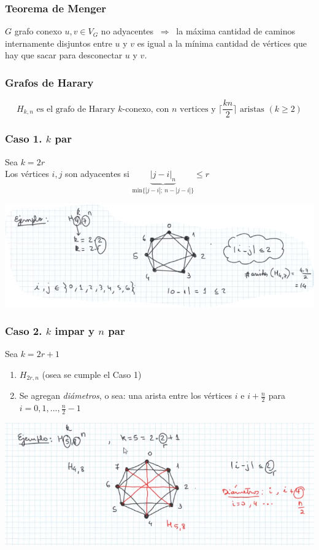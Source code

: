 \documentclass{article}
\newcommand{\Rightarrows}{\: \Rightarrow \:}            %
\begin{document}
\subsubsection{Teorema de Menger}
$G$ grafo conexo $u, v \in V_G$ no adyacentes $\Rightarrows$ la máxima cantidad de
caminos internamente disjuntos entre $u$ y $v$ es igual a la mínima cantidad de
vértices que hay que sacar para desconectar $u$ y $v$.

\subsubsection{Grafos de Harary}
\begin{equation*}
    H_{k,n} \text{ es el grafo de Harary $k$-conexo, con $n$ vertices y } \lceil\frac{kn}{2}\rceil \text{ aristas } (k \geq 2)
\end{equation*}
\subsubsection*{Caso 1. $k$ par}
Sea $k = 2r$
\\ Los vértices $i,j$ son adyacentes si $\underbrace{|j - i|_n}_{\text{min$\{|j - i|;\: n - |j - i|\}$}} \leq r$
\begin{center}
    \includegraphics[width=\textwidth]{hararyC1.PNG}
\end{center}
\subsubsection*{Caso 2. $k$ impar y $n$ par}
Sea $k = 2r + 1$
\begin{enumerate}
    \item $H_{2r,n}$ (osea se cumple el Caso 1)
    \item Se agregan \emph{diámetros}, o sea: una arista entre los vértices $i$ e $i + \frac{n}{2}$ para $i = 0,1,...,\frac{n}{2} - 1$
\end{enumerate}
\begin{center}
    \includegraphics[width=\textwidth]{hararyC2.PNG}
\end{center}
\end{document}
